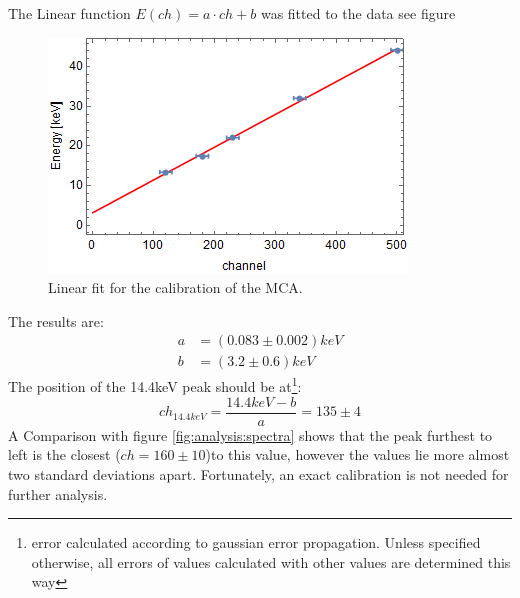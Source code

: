 The Linear function $E(ch)=a\cdot ch+b$ was fitted to the data see figure
\begin{figure}[H]
\centering
\includegraphics[width=1.0\linewidth]{../results/calibration/fit}
\caption[MCA calibration]{Linear fit for the calibration of the MCA.}
\label{fig:calibrationfit}
\end{figure}
The results are:
\begin{equation}
\begin{aligned}
	a &= (0.083\pm0.002)keV\\
	b &= (3.2 \pm 0.6)keV
\end{aligned}
\end{equation}
The position of the 14.4keV peak should be at\footnote{error calculated according to gaussian error propagation. Unless specified otherwise, all errors of values calculated with other values are determined this way}:
\begin{equation}
ch_{14.4keV}=\frac{14.4keV-b}{a}=135\pm4
\end{equation}
A Comparison with figure \ref{fig:analysis:spectra} shows that the peak furthest to left is the closest ($ch=160\pm10$)to this value, however the values lie more almost two standard deviations apart. Fortunately, an exact calibration is not needed for further analysis.

